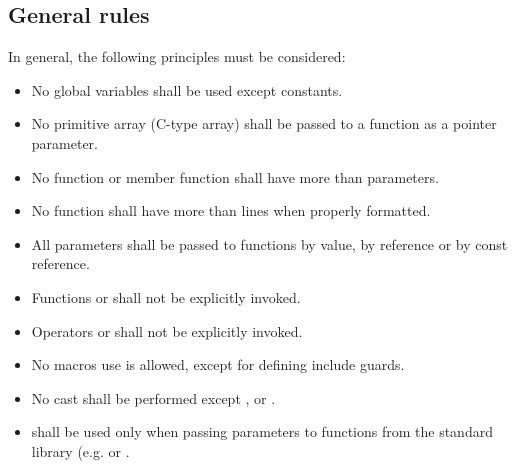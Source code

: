 \subsection{General rules}

In general, the following principles must be considered:

\begin{itemize}

\item No global variables shall be used except constants.

\item No primitive array (C-type array) shall be passed to 
a function as a pointer parameter.

\item No function or member function shall have more than  parameters.

\item No function shall have more than  lines when properly formatted.

\item All parameters shall be passed to functions by value, by reference
or by const reference.

\item Functions  or  shall not be explicitly invoked.

\item Operators  or  shall not be explicitly invoked.

\item No macros use is allowed, except for defining include guards.

\item No cast shall be performed except
,  or .

\item {} shall be used only when passing parameters
to functions from the standard library (e.g.  or .

\end{itemize}

